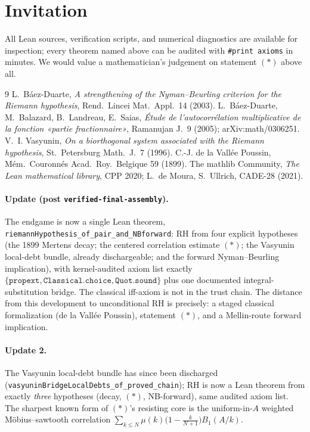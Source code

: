 \documentclass[11pt,a4paper]{article}
\begin{document}
\section*{Invitation}
All Lean sources, verification scripts, and numerical diagnostics are
available for inspection; every theorem named above can be audited with
\texttt{\#print axioms} in minutes. We would value a mathematician's
judgement on statement $(\ast)$ above all.

\begin{thebibliography}{9}\small
{} L.~B\'aez-Duarte, \emph{A strengthening of the Nyman--Beurling
criterion for the Riemann hypothesis}, Rend.\ Lincei Mat.\ Appl.\ 14 (2003).
 L.~B\'aez-Duarte, M.~Balazard, B.~Landreau, E.~Saias,
\emph{\'Etude de l'autocorr\'elation multiplicative de la fonction «partie
fractionnaire»}, Ramanujan J.\ 9 (2005); arXiv:math/0306251.
 V.~I. Vasyunin, \emph{On a biorthogonal system associated with
the Riemann hypothesis}, St.~Petersburg Math.\ J.\ 7 (1996).
 C.-J. de la Vall\'ee Poussin, M\'em.\ Couronn\'es Acad.\ Roy.\
Belgique 59 (1899).
 The mathlib Community, \emph{The Lean mathematical library},
CPP 2020; L.~de Moura, S.~Ullrich, CADE-28 (2021).
\end{thebibliography}

\paragraph{Update (post \texttt{verified-final-assembly}).}
The endgame is now a single Lean theorem,
\texttt{riemannHypothesis\_of\_pair\_and\_NBforward}: RH from four explicit
hypotheses (the 1899 Mertens decay; the centered correlation estimate
$(\ast)$; the Vasyunin local-debt bundle, already dischargeable; and the
forward Nyman--Beurling implication), with kernel-audited axiom list exactly
$\{\texttt{propext}, \texttt{Classical.choice}, \texttt{Quot.sound}\}$ plus
one documented integral-substitution bridge. The classical iff-axiom is not
in the trust chain. The distance from this development to unconditional RH
is precisely: a staged classical formalization (de la Vall\'ee Poussin),
statement $(\ast)$, and a Mellin-route forward implication.


\paragraph{Update 2.} The Vasyunin local-debt bundle has since been
discharged (\texttt{vasyuninBridgeLocalDebts\_of\_proved\_chain}); RH is now
a Lean theorem from exactly \emph{three} hypotheses (decay, $(\ast)$,
NB-forward), same audited axiom list. The sharpest known form of $(\ast)$'s
resisting core is the uniform-in-$A$ weighted M\"obius--sawtooth correlation
$\sum_{k\le N}\mu(k)\bigl(1-\tfrac{k}{N+1}\bigr)B_1(A/k)$.
\end{document}
